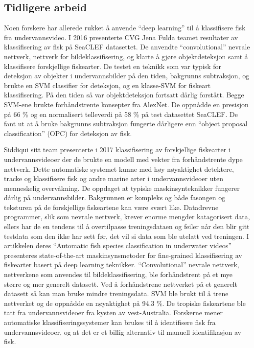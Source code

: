 
\subsection{Tidligere arbeid}

Noen forskere har allerede rukket å anvende ``deep learning'' til å klassifisere fisk fra undervannsvideo. I 2016 presenterte CVG Jena Fulda teamet resultater av klassifisering av fisk på SeaCLEF datasettet. De anvendte ``convolutional'' nevrale nettverk, nettverk for bildeklassifisering, og klarte å gjøre objektdeteksjon samt å klassifisere forskjellige fiskearter. De testet en teknikk som var typisk for deteksjon av objekter i undervannsbilder på den tiden, bakgrunns subtraksjon, og brukte en SVM classifier for deteksjon, og en klasse-SVM for fiskeart klassifisering. På den tiden så var objektdeteksjon fortsatt dårlig forstått. Begge SVM-ene brukte forhåndstrente konsepter fra AlexNet. De oppnådde en presisjon på 66 \% og en normalisert telleverdi på 58 \% på test datasettet SeaCLEF. De fant ut at å bruke bakgrunns subtraksjon fungerte dårligere enn ``object proposal classification'' (OPC) for deteksjon av fisk. \cite{Rodner m.fl. 2016}

Siddiqui sitt team presenterte i 2017 klassifisering av forskjellige fiskearter i undervannsvideoer der de brukte en modell med vekter fra forhåndstrente dype nettverk. Dette automatiske systemet kunne med høy nøyaktighet detektere, tracke og klassifisere fisk og andre marine arter i undervannsvideoer uten menneskelig overvåkning. De oppdaget at typiske maskinsynteknikker fungerer dårlig på undervannsbilder. Bakgrunnen er kompleks og både fasongen og teksturen på de forskjellige fiskeartene kan være svært like. Datadrevne programmer, slik som nevrale nettverk, krever enorme mengder katagorisert data, ellers har de en tendens til å overtilpasse treningsdataen og feiler når den blir gitt testdata som den ikke har sett før, det vil si data som ble utelatt ved treningen. I artikkelen deres  ``Automatic fish species classification in underwater videos'' presenteres state-of-the-art maskinsynsmetoder for fine-grained klassifisering av fiskearter basert på deep learning teknikker. ``Convolutional'' nevrale nettverk, nettverkene som anvendes til bildeklassifisering, ble forhåndstrent på et mye større og mer generelt datasett. Ved å forhåndstrene nettverket på et generelt datasett så kan man bruke mindre treningsdata. SVM ble brukt til å trene nettverket og de oppnådde en nøyaktighet på 94.3 \%. De tropiske fiskeartene ble tatt fra undervannsvideoer fra kysten av vest-Australia. Forskerne mener automatiske klassifiseringssystemer kan brukes til å identifisere fisk fra undervannsvideoer, og at det er et billig alternativ til manuell identifikasjon av fisk. \cite{Siddiqui m.fl. 2017}

